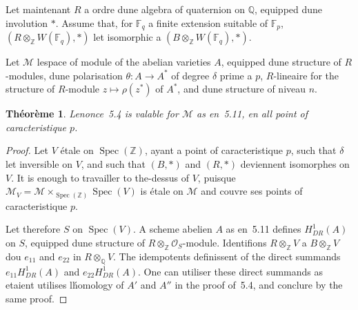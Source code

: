 \documentclass[11pt,a4paper]{article}
\theoremstyle{plain}
\newtheorem{theorem}{Th\'eor\`eme}
\theoremstyle{definition}
\DeclareMathOperator{\Spec}{Spec}
\begin{document}
Let maintenant $R$ a ordre dune algebra of quaternion on $\mathbb{Q}$, equipped
dune involution $*$. Assume that, for $\mathbb{F}_q$ a finite extension suitable of
$\mathbb{F}_p$, $(R \otimes_\mathbb{Z} W(\mathbb{F}_q), *)$ let isomorphic a $(B \otimes_\mathbb{Z} W(\mathbb{F}_q), *)$.

Let $\mathscr{M}$ lespace of module of the abelian varieties $A$, equipped dune structure
of $R$-modules, dune polarisation $\theta: A \to A^*$ of degree $\delta$ prime a $p$, $R$-lineaire
for the structure of $R$-module $z \mapsto \rho(z^*)$ of $A^*$, and dune structure of niveau $n$.

\begin{theorem}
Lenonce~5.4 is valable for $\mathscr{M}$ as en~5.11, en all
point of caracteristique $p$.
\end{theorem}

\begin{proof}
Let $V$ étale on $\Spec(\mathbb{Z})$, ayant a point of caracteristique $p$, such that
$\delta$ let inversible on $V$, and such that $(B, *)$ and $(R, *)$ deviennent isomorphes on $V$.
It is enough to travailler to the-dessus of $V$, puisque $\mathscr{M}_V = \mathscr{M} \times_{\Spec(\mathbb{Z})} \Spec(V)$ is étale on
$\mathscr{M}$ and couvre ses points of caracteristique $p$.

Let therefore $S$ on $\Spec(V)$. A scheme abelien $A$ as en~5.11 defines $H^1_{DR}(A)$
on $S$, equipped dune structure of $R \otimes_\mathbb{Z} \mathscr{O}_S$-module. Identifions $R \otimes_\mathbb{Z} V$ a $B \otimes_\mathbb{Z} V$
dou $e_{11}$ and $e_{22}$ in $R \otimes_\mathbb{Q} V$. The idempotents definissent of the direct summands $e_{11}H^1_{DR}(A)$
and $e_{22}H^1_{DR}(A)$. One can utiliser these direct summands as etaient utilises
l\'homology of $A'$ and $A''$ in the proof of~5.4, and conclure by the same
proof.
\end{proof}
\end{document}
